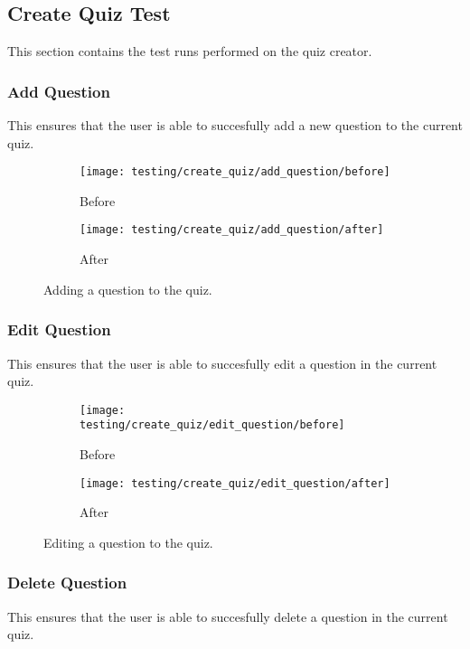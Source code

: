 \subsection{Create Quiz Test} %
\label{sub:create_quiz_test}
This section contains the test runs performed on the quiz creator.
\clearpage

\subsubsection{Add Question} %
\label{ssub:add_question}
This ensures that the user is able to succesfully add a new question to the current quiz.

\begin{figure}[!htbp]
\centering
\begin{subfigure}{0.5\textwidth}
  \centering
  \texttt{[image: testing/create\_quiz/add\_question/before]}
  \caption{Before}
  \label{fig:sub1}
\end{subfigure}%
\begin{subfigure}{0.5\textwidth}
  \centering
  \texttt{[image: testing/create\_quiz/add\_question/after]}
  \caption{After}
  \label{fig:sub2}
\end{subfigure}
\caption{Adding a question to the quiz.}
\label{fig:test}
\end{figure}

\subsubsection{Edit Question} %
\label{ssub:add_question}
This ensures that the user is able to succesfully edit a question in the current quiz.

\begin{figure}[!htbp]
\centering
\begin{subfigure}{0.5\textwidth}
  \centering
  \texttt{[image: testing/create\_quiz/edit\_question/before]}
  \caption{Before}
  \label{fig:sub1}
\end{subfigure}%
\begin{subfigure}{0.5\textwidth}
  \centering
  \texttt{[image: testing/create\_quiz/edit\_question/after]}
  \caption{After}
  \label{fig:sub2}
\end{subfigure}
\caption{Editing a question to the quiz.}
\label{fig:test}
\end{figure}

\subsubsection{Delete Question} %
\label{ssub:add_question}
This ensures that the user is able to succesfully delete a question in the current quiz.

